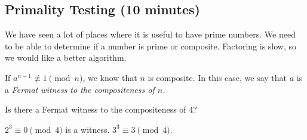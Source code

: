 \documentclass[letterpaper, 11 pt]{article}
\begin{document}
\subsection{Primality Testing (10 minutes)}

We have seen a lot of places where it is useful to have prime numbers. We need to be able to determine if a number is prime or composite. Factoring is slow, so we would like a better algorithm. 

\begin{defn}
 If $a^{n-1}\not\equiv 1 \pmod n$, we know that $n$ is composite. In this case, we say that $a$ is a \emph{Fermat witness to the compositeness of $n$.}
\end{defn}

\begin{br}[3 minutes]
Is there a Fermat witness to the compositeness of 4? 
\end{br}
\begin{solution}
$2^3\equiv 0 \pmod 4$ is a witness. $3^3\equiv 3 \pmod 4$.
\end{solution}
\end{document}
